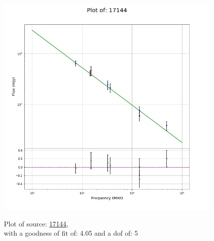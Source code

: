\documentclass{article}
\begin{document}
\begin{figure}[H]
\begin{minipage}{0.5\textwidth}
        \includegraphics[scale = 0.35]{KmeulenTrap4P23_1min/1min17144.png}
        \captionsetup{labelformat=empty}
        \caption{Plot of source: \href{http://banana.transientskp.org/r4/vlo_KmeulenTrap4P23/runningcatalog/17144}{17144},\\with a goodness of fit of: 4.05 and a dof of: 5}
    \addtocounter{figure}{-1}
    \label{KmeulenTrap4P23:1min:17144:plot}
    \end{minipage}
\end{figure}
\end{document}
